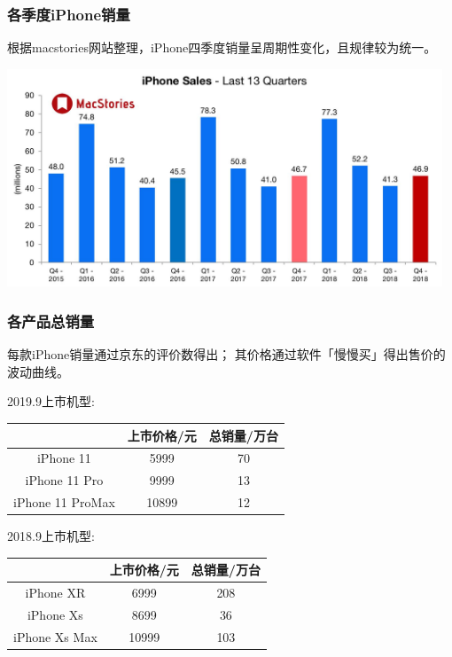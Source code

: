 \documentclass[12pt]{ctexart}
\begin{document}
        \subsubsection{各季度iPhone销量}
            根据macstories网站整理，iPhone四季度销量呈周期性变化，且规律较为统一。
            \begin{center}
                \includegraphics[width=13cm]{quarters.jpg}
            \end{center}
            
        \subsubsection{各产品总销量}
            每款iPhone销量通过京东的评价数得出；
            其价格通过软件「慢慢买」得出售价的波动曲线。
                
            2019.9上市机型:
            \begin{center}
                \begin{tabular}{|c|cc|}
                    \hline
                     & 上市价格/元 & 总销量/万台 \\
                    \hline
                    iPhone 11 &5999 &70 \\
                    \hline
                    iPhone 11 Pro&9999 &13\\
                    \hline
                    iPhone 11 ProMax&10899 &12\\
                    \hline
                \end{tabular}
            \end{center}

                2018.9上市机型:
            \begin{center}
                \begin{tabular}{|c|cc|}
                    \hline
                     & 上市价格/元 & 总销量/万台 \\
                    \hline
                    iPhone XR  &6999 &208 \\
                    \hline
                    iPhone Xs &8699 &36\\
                    \hline
                    iPhone Xs Max&10999 &103\\
                    \hline
                \end{tabular}
            \end{center}
\end{document}
